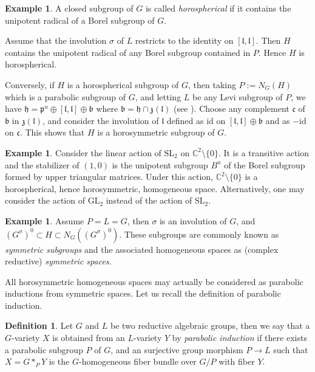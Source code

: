 \documentclass{amsart}
\theoremstyle{definition}
\newtheorem{defn}[thm]{Definition}
\newtheorem{exa}[thm]{Example}
\begin{document}
\begin{exa}
\label{exa_horospherical}
A closed subgroup of $G$ is called \emph{horospherical}
if it contains the unipotent radical of a Borel subgroup of $G$.
 
Assume that the involution $\sigma$ of $L$ restricts to the identity  
on $[\mathfrak{l},\mathfrak{l}]$. Then $H$ contains the unipotent 
radical of any Borel subgroup contained in $P$. Hence $H$ is horospherical.

Conversely, if $H$ is a horospherical subgroup of $G$, then taking 
$P:=N_G(H)$ which is a parabolic subgroup of $G$, and letting $L$ be 
any Levi subgroup of $P$, we have 
$\mathfrak{h}=\mathfrak{p}^u\oplus [\mathfrak{l},\mathfrak{l}] \oplus \mathfrak{b}$
where $\mathfrak{b}=\mathfrak{h}\cap \mathfrak{z}(\mathfrak{l})$ (see \cite[Section 2]{Pas08}). 
Choose any complement $\mathfrak{c}$ of $\mathfrak{b}$ in $\mathfrak{z}(\mathfrak{l})$, 
and consider the involution of $\mathfrak{l}$ defined as 
$\mathrm{id}$ on $[\mathfrak{l},\mathfrak{l}]\oplus \mathfrak{b}$ 
and as $-\mathrm{id}$ on $\mathfrak{c}$. This shows that $H$ is a 
horosymmetric subgroup of $G$.
\end{exa}

\begin{exa}
\label{exa_C2minus0}
Consider the linear action of $\mathrm{SL}_2$ on $\mathbb{C}^2\setminus\{0\}$. 
It is a transitive action and the stabilizer of $(1,0)$ is 
the unipotent subgroup $B^u$ of the Borel subgroup formed 
by upper triangular matrices. Under this action, $\mathbb{C}^2\setminus\{0\}$
is a horospherical, hence horosymmetric, homogeneous space.
Alternatively, one may consider the action of $\mathrm{GL}_2$ instead 
of the action of $\mathrm{SL}_2$.
\end{exa}


\begin{exa}
\label{exa_symmetric_subgroup}
Assume $P=L=G$, then $\sigma$ is an involution of $G$, and 
$(G^{\sigma})^0\subset H\subset N_G((G^{\sigma})^0)$. These 
subgroups are commonly known as \emph{symmetric subgroups} and the 
associated homogeneous spaces as (complex reductive) \emph{symmetric spaces}.
\end{exa}

All horosymmetric homogeneous spaces may actually be considered as 
parabolic inductions from symmetric spaces. 
Let us recall the definition of parabolic induction.
\begin{defn}
Let $G$ and $L$ be two reductive algebraic groups, then we say that a 
$G$-variety $X$ is obtained from an $L$-variety $Y$ by 
\emph{parabolic induction} if 
there exists a parabolic subgroup $P$ of $G$, and an surjective group morphism 
$P\rightarrow L$ such that $X=G*_PY$ is the $G$-homogeneous fiber bundle 
over $G/P$ with fiber $Y$.
\end{defn}
\end{document}
